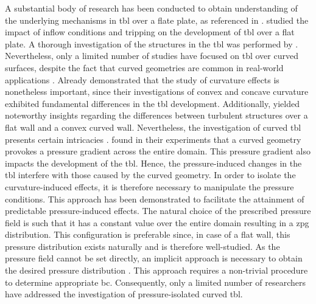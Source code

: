 A substantial body of research has been conducted to obtain understanding of the underlying mechanisms in \acrfull{tbl} over a flate plate, as referenced in \citep{pargal_adverse-pressure-gradient_2022}.
\citet{schlatter_turbulent_2012} studied the impact of inflow conditions and tripping on the development of \acrshort{tbl} over a flat plate.
A thorough investigation of the structures in the \acrshort{tbl} was performed by \citet{jimenez_near-wall_2013}.
Nevertheless, only a limited number of studies have focused on \acrshort{tbl} over curved surfaces, despite the fact that curved geometries are common in real-world applications \citep{spalart_direct_2024}.
Already \citet{muck_effect_1985} demonstrated that the study of curvature effects is nonetheless important, since their investigations of convex and concave curvature exhibited fundamental differences in the \acrshort{tbl} development.
Additionally, \citet{chiwanga_effect_1993} yielded noteworthy insights regarding the differences between turbulent structures over a flat wall and a convex curved wall.
Nevertheless, the investigation of curved \acrshort{tbl} presents certain intricacies \citep{appelbaum_systematic_2025}.
\citet{so_experiment_1973} found in their experiments that a curved geometry provokes a pressure gradient across the entire domain.
This pressure gradient also impacts the development of the \acrshort{tbl}.
Hence, the pressure-induced changes in the \acrshort{tbl} interfere with those caused by the curved geometry.
In order to isolate the curvature-induced effects, it is therefore necessary to manipulate the pressure conditions.
This approach has been demonstrated to facilitate the attainment of predictable pressure-induced effects.
The natural choice of the prescribed pressure field is such that it has a constant value over the entire domain resulting in a \acrfull{zpg} distribution.
This configuration is preferable since, in case of a flat wall, this pressure distribution exists naturally and is therefore well-studied.
As the pressure field cannot be set directly, an implicit approach is necessary to obtain the desired pressure distribution \citep{appelbaum_systematic_2025}.
This approach requires a non-trivial procedure to determine appropriate \acrfull{bc}.
Consequently, only a limited number of researchers have addressed the investigation of pressure-isolated curved \acrshort{tbl}.


